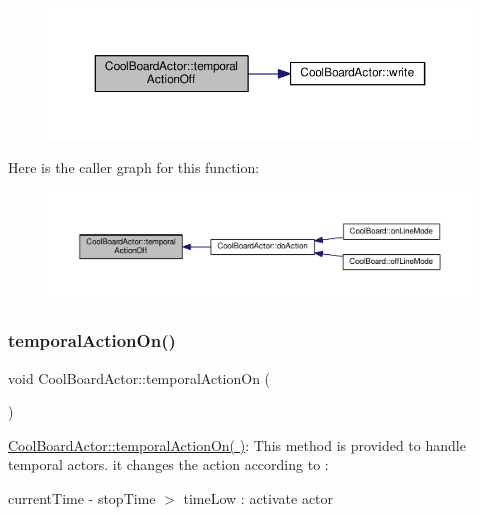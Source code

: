\begin{figure}[H]
\begin{center}
\leavevmode
\includegraphics[width=350pt]{dc/d69/class_cool_board_actor_a02698bd647df49cabbe74513d4d88918_cgraph}
\end{center}
\end{figure}
Here is the caller graph for this function\+:\nopagebreak
\begin{figure}[H]
\begin{center}
\leavevmode
\includegraphics[width=350pt]{dc/d69/class_cool_board_actor_a02698bd647df49cabbe74513d4d88918_icgraph}
\end{center}
\end{figure}
\mbox{\label{class_cool_board_actor_ada603785c203fdb0b41cc967d70bdc4d}} 
\subsubsection{\texorpdfstring{temporal\+Action\+On()}{temporalActionOn()}}
{\footnotesize\ttfamily void Cool\+Board\+Actor\+::temporal\+Action\+On (\begin{DoxyParamCaption}{ }\end{DoxyParamCaption})}

\hyperlink{class_cool_board_actor_ada603785c203fdb0b41cc967d70bdc4d}{Cool\+Board\+Actor\+::temporal\+Action\+On( )}\+: This method is provided to handle temporal actors. it changes the action according to \+:

current\+Time -\/ stop\+Time $>$ time\+Low \+: activate actor 

